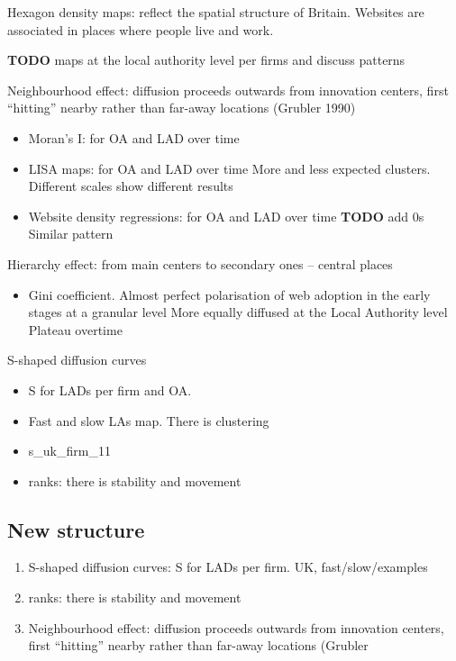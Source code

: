 \documentclass[
  authoryear,
  preprint,
  3p]{elsarticle}
\providecommand{\tightlist}{%
  \setlength{\itemsep}{0pt}\setlength{\parskip}{0pt}}\usepackage{longtable,booktabs,array}
\begin{document}
Hexagon density maps: reflect the spatial structure of Britain. Websites
are associated in places where people live and work.

\textbf{TODO} maps at the local authority level per firms and discuss
patterns

Neighbourhood effect: diffusion proceeds outwards from innovation
centers, first ``hitting'' nearby rather than far-away locations
(Grubler 1990)

\begin{itemize}
\item
  Moran's I: for OA and LAD over time
\item
  LISA maps: for OA and LAD over time More and less expected clusters.
  Different scales show different results
\item
  Website density regressions: for OA and LAD over time \textbf{TODO}
  add 0s Similar pattern
\end{itemize}

Hierarchy effect: from main centers to secondary ones -- central places

\begin{itemize}
\tightlist
\item
  Gini coefficient. Almost perfect polarisation of web adoption in the
  early stages at a granular level More equally diffused at the Local
  Authority level Plateau overtime
\end{itemize}

S-shaped diffusion curves

\begin{itemize}
\item
  S for LADs per firm and OA.
\item
  Fast and slow LAs map. There is clustering
\item
  s\_uk\_firm\_11
\item
  ranks: there is stability and movement
\end{itemize}

\hypertarget{new-structure}{%
\subsection{New structure}\label{new-structure}}

\begin{enumerate}
\def\labelenumi{\arabic{enumi}.}
\item
  S-shaped diffusion curves: S for LADs per firm. UK, fast/slow/examples
\item
  ranks: there is stability and movement
\item
  Neighbourhood effect: diffusion proceeds outwards from innovation
  centers, first ``hitting'' nearby rather than far-away locations
  (Grubler
\end{enumerate}
\end{document}
